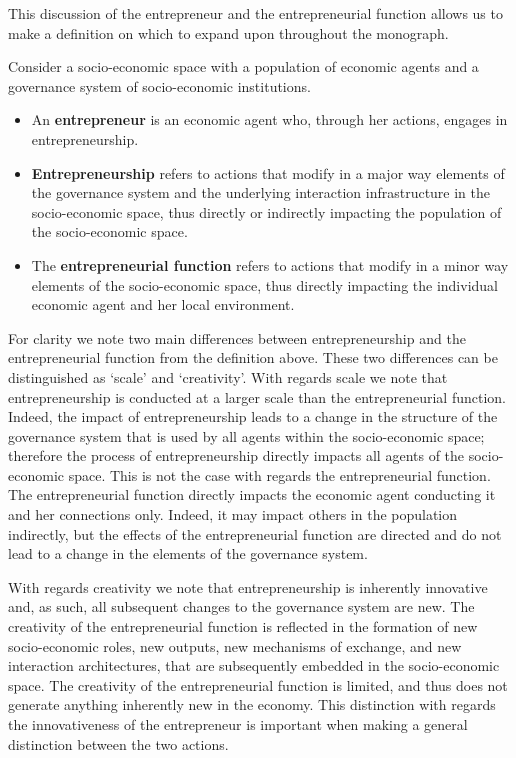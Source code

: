 This discussion of the entrepreneur and the entrepreneurial function allows us to make a definition on which to expand upon throughout the monograph.
\begin{definition} \label{def:entrepreneur}
Consider a socio-economic space with a population of economic agents and a governance system of socio-economic institutions.
\begin{itemize}
	\item An \textbf{entrepreneur} is an economic agent who, through her actions, engages in entrepreneurship.
	\item \textbf{Entrepreneurship} refers to actions that modify in a major way elements of the governance system and the underlying interaction infrastructure in the socio-economic space, thus directly or indirectly impacting the population of the socio-economic space.
	\item The \textbf{entrepreneurial function} refers to actions that modify in a minor way elements of the socio-economic space, thus directly impacting the individual economic agent and her local environment.
\end{itemize}
\end{definition}
For clarity we note two main differences between entrepreneurship and the entrepreneurial function from the definition above. These two differences can be distinguished as `scale' and `creativity'. With regards scale we note that entrepreneurship is conducted at a larger scale than the entrepreneurial function. Indeed, the impact of entrepreneurship leads to a change in the structure of the governance system that is used by all agents within the socio-economic space; therefore the process of entrepreneurship directly impacts all agents of the socio-economic space. This is not the case with regards the entrepreneurial function. The entrepreneurial function directly impacts the economic agent conducting it and her connections only. Indeed, it may impact others in the population indirectly, but the effects of the entrepreneurial function are directed and do not lead to a change in the elements of the governance system.

With regards creativity we note that entrepreneurship is inherently innovative and, as such, all subsequent changes to the governance system are new. The creativity of the entrepreneurial function is reflected in the formation of new socio-economic roles, new outputs, new mechanisms of exchange, and new interaction architectures, that are subsequently embedded in the socio-economic space. The creativity of the entrepreneurial function is limited, and thus does not generate anything inherently new in the economy. This distinction with regards the innovativeness of the entrepreneur is important when making a general distinction between the two actions.

